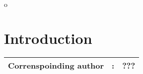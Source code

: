 o\chapter{Introduction}
{\bf \Large 
\begin{tabular}{ccc}
\hline
  Correnspoinding author & : & ???\\
\hline
\end{tabular}
}
